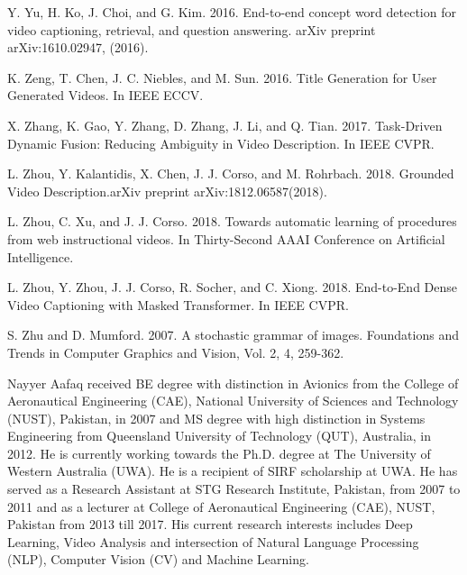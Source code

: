 \documentclass[10pt,journal,compsoc]{IEEEtran}
\begin{document}
\begin{thebibliography}{1}
Y. Yu, H. Ko, J. Choi, and G. Kim. 2016. End-to-end concept word detection for video captioning, retrieval, and question answering. arXiv preprint arXiv:1610.02947, (2016).

K. Zeng, T. Chen, J. C. Niebles, and M. Sun. 2016. Title Generation for User Generated Videos. In IEEE ECCV.

X. Zhang, K. Gao, Y. Zhang, D. Zhang, J. Li, and Q. Tian. 2017. Task-Driven Dynamic Fusion: Reducing Ambiguity in Video Description. In IEEE CVPR.

L. Zhou, Y. Kalantidis, X. Chen, J. J. Corso, and M. Rohrbach. 2018. Grounded Video Description.arXiv preprint arXiv:1812.06587(2018).

L. Zhou, C. Xu, and J. J. Corso. 2018. Towards automatic learning of procedures from web instructional videos. In Thirty-Second AAAI Conference on Artificial Intelligence.

L. Zhou, Y. Zhou, J. J. Corso, R. Socher, and C. Xiong. 2018.  End-to-End Dense Video Captioning with Masked Transformer. In IEEE CVPR.

S. Zhu and D. Mumford. 2007. A stochastic grammar of images. Foundations and Trends in Computer Graphics and Vision, Vol. 2, 4, 259-362.

\end{thebibliography}
% 
% 
\vspace{-20mm}
\begin{IEEEbiography} %
{Nayyer Aafaq} received BE degree with distinction in Avionics from the College of Aeronautical Engineering (CAE), National University of Sciences and Technology (NUST), Pakistan, in 2007 and MS degree with high distinction in Systems Engineering from Queensland University of Technology (QUT), Australia, in 2012.
He is currently working towards the Ph.D. degree at The University of Western Australia (UWA). He is a recipient of SIRF scholarship at UWA. He has served as a Research Assistant at STG Research Institute, Pakistan, from 2007 to 2011 and as a lecturer at College of Aeronautical Engineering (CAE), NUST, Pakistan from 2013 till 2017. His current research interests includes Deep Learning, Video Analysis and intersection of Natural Language Processing (NLP), Computer Vision (CV) and Machine Learning. 
\end{IEEEbiography}
\end{document}

